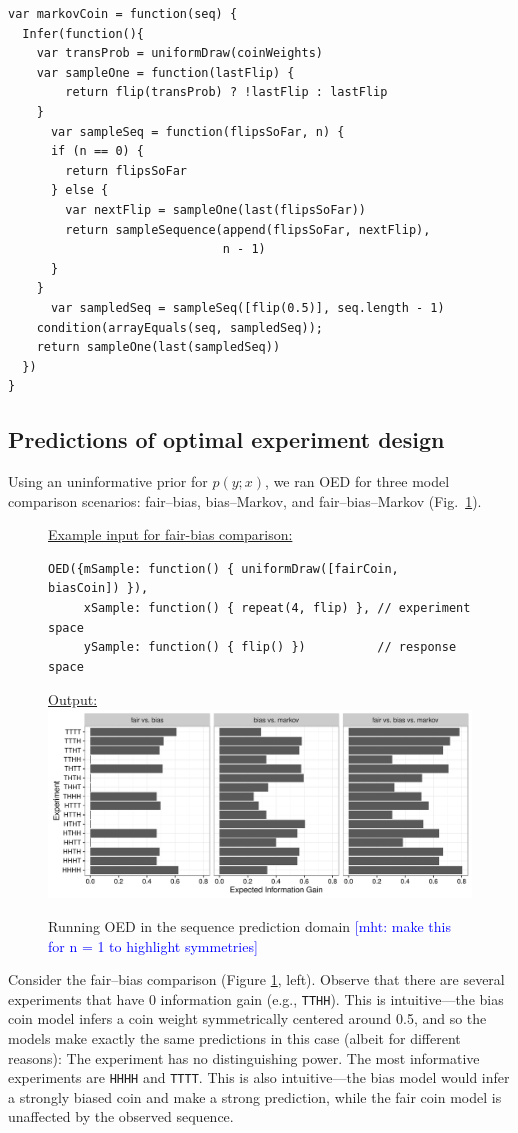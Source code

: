 \documentclass{article}
\newcommand{\mht}[1]{\textcolor{Blue}{[mht: #1]}}
\begin{document}
\begin{lstlisting}[caption=Markov coin model, upquote=true]
var markovCoin = function(seq) {
  Infer(function(){
    var transProb = uniformDraw(coinWeights)
    var sampleOne = function(lastFlip) {
        return flip(transProb) ? !lastFlip : lastFlip
    }
 	  var sampleSeq = function(flipsSoFar, n) {
      if (n == 0) {
        return flipsSoFar
      } else {
        var nextFlip = sampleOne(last(flipsSoFar))
        return sampleSequence(append(flipsSoFar, nextFlip),
                              n - 1)
      }
    }
	  var sampledSeq = sampleSeq([flip(0.5)], seq.length - 1)
    condition(arrayEquals(seq, sampledSeq));
    return sampleOne(last(sampledSeq))
  })
}
\end{lstlisting}

\subsection{Predictions of optimal experiment design}

Using an uninformative prior for $p(y; x)$, we ran OED for three model comparison scenarios: fair--bias, bias--Markov, and fair--bias--Markov (Fig.~\ref{fig:run-coin}).

\begin{figure}[h]
\underline{\textsf{Example input for fair-bias comparison:}}
\begin{lstlisting}
OED({mSample: function() { uniformDraw([fairCoin, biasCoin]) }),
     xSample: function() { repeat(4, flip) }, // experiment space
     ySample: function() { flip() })          // response space
\end{lstlisting}

\underline{\textsf{Output:}}\\
\includegraphics[width=\columnwidth]{img/coin_eig.pdf}
\caption{Running OED in the sequence prediction domain \mht{make this for n = 1 to highlight symmetries}}
\label{fig:run-coin}
\end{figure}
Consider the fair--bias comparison (Figure \ref{fig:run-coin}, left).
Observe that there are several experiments that have 0 information gain (e.g., \lstinline{TTHH}).
This is intuitive---the bias coin model infers a coin weight symmetrically centered around 0.5, and so the models make exactly the same predictions in this case (albeit for different reasons): The experiment has no distinguishing power.
The most informative experiments are \lstinline{HHHH} and \lstinline{TTTT}.
This is also intuitive---the bias model would infer a strongly biased coin and make a strong prediction, while the fair coin model is unaffected by the observed sequence.
\end{document}
